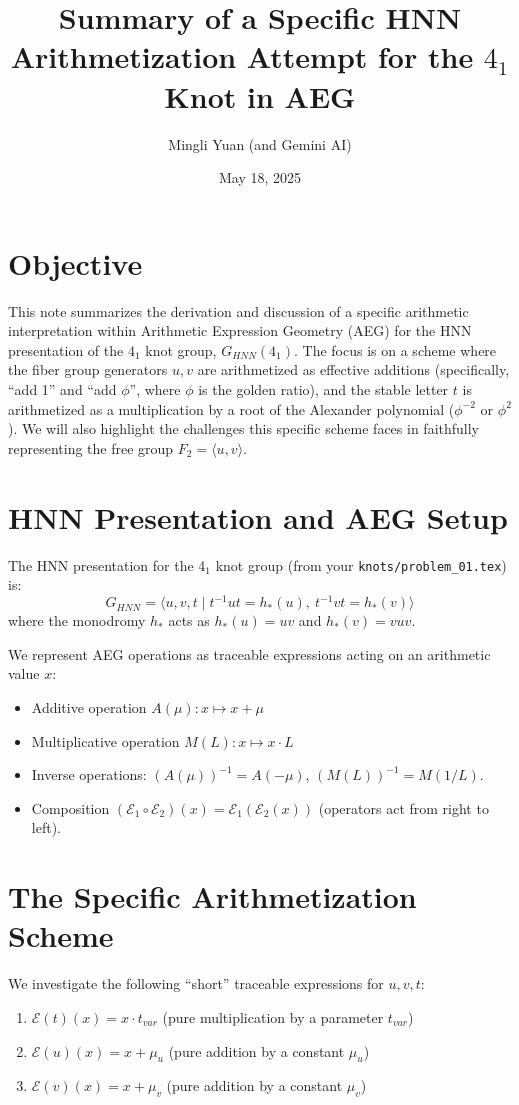 \documentclass[12pt, a4paper]{article}
\title{Summary of a Specific HNN Arithmetization Attempt for the $4_1$ Knot in AEG}
\author{Mingli Yuan (and Gemini AI)}
\date{May 18, 2025}
\begin{document}
\maketitle

\section{Objective}
This note summarizes the derivation and discussion of a specific arithmetic interpretation within Arithmetic Expression Geometry (AEG) for the HNN presentation of the $4_1$ knot group, $G_{HNN}(4_1)$. The focus is on a scheme where the fiber group generators $u,v$ are arithmetized as effective additions (specifically, ``add 1'' and ``add $\phi$'', where $\phi$ is the golden ratio), and the stable letter $t$ is arithmetized as a multiplication by a root of the Alexander polynomial ($\phi^{-2}$ or $\phi^2$). We will also highlight the challenges this specific scheme faces in faithfully representing the free group $F_2 = \langle u,v \rangle$.

\section{HNN Presentation and AEG Setup}
The HNN presentation for the $4_1$ knot group (from your \texttt{knots/problem\_01.tex}) is:
$$ G_{HNN} = \langle u, v, t \mid t^{-1}ut = h_*(u), \ t^{-1}vt = h_*(v) \rangle $$
where the monodromy $h_*$ acts as $h_*(u) = uv$ and $h_*(v) = vuv$.

We represent AEG operations as traceable expressions acting on an arithmetic value $x$:
\begin{itemize}
    \item Additive operation $A(\mu): x \mapsto x + \mu$
    \item Multiplicative operation $M(L): x \mapsto x \cdot L$
    \item Inverse operations: $(A(\mu))^{-1} = A(-\mu)$, $(M(L))^{-1} = M(1/L)$.
    \item Composition $(\mathcal{E}_1 \circ \mathcal{E}_2)(x) = \mathcal{E}_1(\mathcal{E}_2(x))$ (operators act from right to left).
\end{itemize}

\section{The Specific Arithmetization Scheme}
We investigate the following ``short'' traceable expressions for $u, v, t$:
\begin{enumerate}
    \item $\mathcal{E}(t)(x) = x \cdot t_{var}$ (pure multiplication by a parameter $t_{var}$)
    \item $\mathcal{E}(u)(x) = x + \mu_u$ (pure addition by a constant $\mu_u$)
    \item $\mathcal{E}(v)(x) = x + \mu_v$ (pure addition by a constant $\mu_v$)
\end{enumerate}
\end{document}
